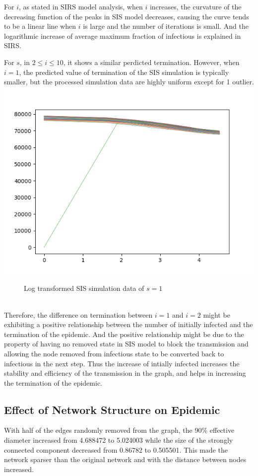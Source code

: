 \documentclass{subfile}
\begin{document}
  For \(i\), as stated in SIRS model analysis, when \(i\) increases, the curvature of the decreasing function of the peaks in SIS model decreases, causing the curve tends to be a linear line when \(i\) is large and the number of iterations is small. And the logarithmic increase of average maximum fraction of infectious is explained in SIRS.

  For \(s\), in \(2\leq i \leq 10\), it shows a similar perdicted termination. However, when \(i=1\), the predicted value of termination of the SIS simulation is typically smaller, but the processed simulation data are highly uniform except for 1 outlier.\\
  \includegraphics{sis_s1_processed}
  \begin{figure}[!h]
    \caption{Log transformed SIS simulation data of \(s=1\)}
  \end{figure}\\
  Therefore, the difference on termination between \(i=1\) and \(i=2\) might be exhibiting a positive relationship between the number of initially infected and the termination of the epidemic. And the positive relationship might be due to the property of having no removed state in SIS model to block the transmission and allowing the node removed from infectious state to be converted back to infectious in the next step. Thus the increase of intially infected increases the stability and efficiency of the transmission in the graph, and helps in increasing the termination of the epidemic.

  \subsection{Effect of Network Structure on Epidemic}
  With half of the edges randomly removed from the graph, the 90\% effective diameter increased from 4.688472 to 5.024003 while the size of the strongly connected component decreased from 0.86782 to 0.505501. This made the network sparser than the original network and with the distance between nodes increased.
\end{document}
